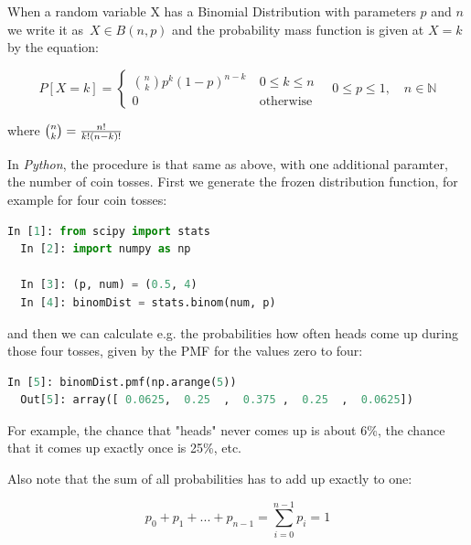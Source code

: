 When a random variable X has a Binomial Distribution with parameters $p$ and $n$ we write it as $\,X \in B(n,p)$ and the probability mass function is given at $X=k$ by the equation:

\begin{equation}
    P\left[X = k\right] = \begin{cases} {n \choose k} p^k \left(1-p\right)^{n-k}\ & 0 \le k \le n \\ 0 & \mbox{otherwise} \end{cases} \quad 0 \leq p \leq 1, \quad n \in \mathbb{N}
\end{equation}

where ${n \choose k}={n! \over k!(n-k)!}$

\vspace{5 mm}

In \emph{Python}, the procedure is that same as above, with one additional paramter, the number of coin tosses. First we generate the frozen distribution function, for example for four coin tosses:

\begin{lstlisting}[language=Python]
  In [1]: from scipy import stats
  In [2]: import numpy as np

  In [3]: (p, num) = (0.5, 4)
  In [4]: binomDist = stats.binom(num, p)
\end{lstlisting}

and then we can calculate e.g. the probabilities how often heads come up during those four tosses, given by the PMF for the values zero to four:

\begin{lstlisting}[language=Python]
  In [5]: binomDist.pmf(np.arange(5))
  Out[5]: array([ 0.0625,  0.25  ,  0.375 ,  0.25  ,  0.0625])
\end{lstlisting}

For example, the chance that "heads" never comes up is about 6\%, the chance that it comes up exactly once is 25\%, etc.

Also note that the sum of all probabilities has to add up exactly to one:

\begin{equation}\label{eq:discreteSum}
  p_0 + p_1 + ... + p_{n-1} = \sum_{i=0}^{n-1} p_i = 1
\end{equation}


